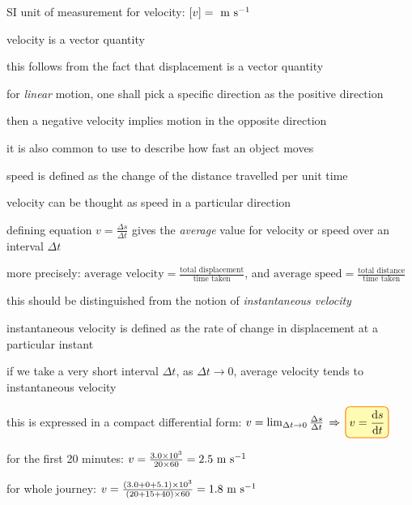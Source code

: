 \cmt SI unit of measurement for velocity: $[v]= \text{ m s$^{-1}$}$

\cmt velocity is a vector quantity

this follows from the fact that displacement is a vector quantity

\cmt for \emph{linear} motion, one shall pick a specific direction as the positive direction

then a negative velocity implies motion in the opposite direction

\cmt it is also common to use  to describe how fast an object moves

speed is defined as the change of the distance travelled per unit time

velocity can be thought as speed in a particular direction

\cmt defining equation $v=\frac{\Delta s}{\Delta t}$ gives the \emph{average} value for velocity or speed over an interval $\Delta t$

more precisely: $\boxed{\text{average velocity} = \frac{\text{total displacement}}{\text{time taken}}}$, and $\boxed{\text{average speed} = \frac{\text{total distance}}{\text{time taken}}}$

\eqyskip this should be distinguished from the notion of \emph{instantaneous velocity}

instantaneous velocity is defined as the rate of change in displacement at a particular instant

if we take a very short interval $\Delta t$, as $\Delta t \to 0$, average velocity tends to instantaneous velocity

this is expressed in a compact differential form: $v = \lim_{\Delta t \to 0} \frac{\Delta s}{\Delta t} \ra \boxed{v=\frac{\dd s}{\dd t}} $


\sol for the first 20 minutes: $ v = \frac{3.0\times10^3}{20 \times 60} = 2.5 \text{ m s$^{-1}$}$

\eqyskip for whole journey: $v = \frac{(3.0+0+5.1)\times10^3}{(20+15+40)\times60} = 1.8 \text{ m s$^{-1}$} $ \eoe



